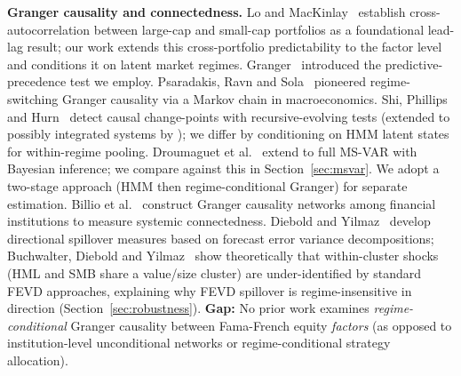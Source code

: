 \documentclass[sigconf,anonymous]{acmart}
\begin{document}
\textbf{Granger causality and connectedness.}
Lo and MacKinlay~\cite{lo1990contrarian} establish cross-autocorrelation
between large-cap and small-cap portfolios as a foundational lead-lag result;
our work extends this cross-portfolio predictability to the factor level and
conditions it on latent market regimes.
Granger~\cite{granger1969investigating} introduced the predictive-precedence test
we employ. Psaradakis, Ravn and Sola~\cite{psaradakis2005markov} pioneered
regime-switching Granger causality via a Markov chain in macroeconomics.
Shi, Phillips and Hurn~\cite{shi2018change} detect causal change-points with recursive-evolving tests (extended to possibly integrated systems by \citealt{shi2020causal}); we differ by conditioning on HMM latent states for within-regime pooling.
Droumaguet et al.~\cite{droumaguet2017granger} extend to full MS-VAR with Bayesian inference; we compare against this in Section~\ref{sec:msvar}.
We adopt a two-stage approach (HMM then regime-conditional Granger) for separate estimation.
Billio et al.~\cite{billio2012econometric} construct Granger causality
networks among financial institutions to measure systemic connectedness.
Diebold and Yilmaz~\cite{diebold2012better} develop directional spillover measures
based on forecast error variance decompositions; Buchwalter, Diebold and
Yilmaz~\cite{buchwalter2025clustered} show theoretically that within-cluster shocks
(HML and SMB share a value/size cluster) are under-identified by standard FEVD approaches,
explaining why FEVD spillover is regime-insensitive in direction (Section~\ref{sec:robustness}).
\textbf{Gap:} No prior work examines \emph{regime-conditional} Granger causality
between Fama-French equity \emph{factors} (as opposed to institution-level
unconditional networks or regime-conditional strategy allocation).
\end{document}
